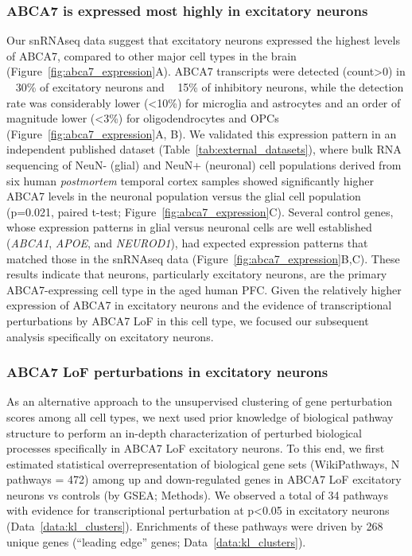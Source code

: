 \subsubsection{ABCA7 is expressed most highly in excitatory neurons}
Our snRNAseq data suggest that excitatory neurons expressed the highest levels of ABCA7, compared to other major cell types in the brain (Figure~\ref{fig:abca7_expression}A).  ABCA7 transcripts were detected (count>0) in ~ 30\% of excitatory neurons and ~ 15\% of inhibitory neurons, while the detection rate was considerably lower (<10\%) for microglia and astrocytes and an order of magnitude lower (<3\%) for oligodendrocytes and OPCs (Figure~\ref{fig:abca7_expression}A, B). We validated this expression pattern in an independent published dataset\cite{Welch2022-ef} (Table~\ref{tab:external_datasets}), where bulk RNA sequencing of NeuN- (glial) and NeuN+ (neuronal) cell populations derived from six human \textit{postmortem} temporal cortex samples showed significantly higher ABCA7 levels in the neuronal population versus the glial cell population (p=0.021, paired t-test; Figure~\ref{fig:abca7_expression}C). Several control genes, whose expression patterns in glial versus neuronal cells are well established (\textit{ABCA1}, \textit{APOE}, and \textit{NEUROD1}), had expected expression patterns that matched those in the snRNAseq data (Figure~\ref{fig:abca7_expression}B,C). These results indicate that neurons, particularly excitatory neurons, are the primary ABCA7-expressing cell type in the aged human PFC. Given the relatively higher expression of ABCA7 in excitatory neurons and the evidence of transcriptional perturbations by ABCA7 LoF in this cell type, we focused our subsequent analysis specifically on excitatory neurons.

\subsubsection{ABCA7 LoF perturbations in excitatory neurons}
As an alternative approach to the unsupervised clustering of gene perturbation scores among all cell types, we next used prior knowledge of biological pathway structure to perform an in-depth characterization of perturbed biological processes specifically in ABCA7 LoF excitatory neurons. To this end, we first estimated statistical overrepresentation of biological gene sets (WikiPathways, N pathways = 472) among up and down-regulated genes in ABCA7 LoF excitatory neurons vs controls (by GSEA; Methods). We observed a total of 34 pathways with evidence for transcriptional perturbation at p<0.05 in excitatory neurons (Data~\ref{data:kl_clusters}). Enrichments of these pathways were driven by 268 unique genes (“leading edge” genes\cite{Subramanian2005-pu}; Data~\ref{data:kl_clusters}).   

